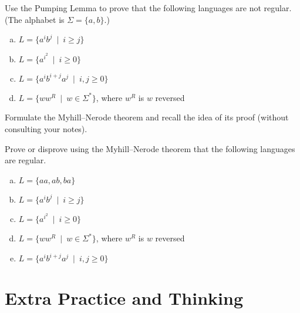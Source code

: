 \documentclass[a4paper,12pt]{amsart}
\begin{document}
    
\medskip\begin{problem}
    
    Use the Pumping Lemma to prove that the following languages are not regular. (The alphabet is $\Sigma=\{a,b\}$.)
    
    \medskip
      
    \begin{enumerate}[(a)]\setlength\itemsep{6pt}        
        \item $L=\{a^ib^j\ \mid\ i\geq j\}$       
        \item $L=\{a^{i^2}\ \mid\ i\geq 0\}$        
        \item $L=\{a^ib^{i+j}a^j\ \mid\ i,j\geq 0\}$
        \item $L=\{ww^R\ \mid \ w\in\Sigma^*\}$, where $w^R$ is $w$ reversed
    \end{enumerate}
      
\end{problem}


\medskip\begin{problem}
    
    Formulate the Myhill--Nerode theorem and recall the idea of its proof (without consulting your notes).

\end{problem}


\medskip\begin{problem}

    Prove or disprove using the Myhill--Nerode theorem that the following languages are regular.
    \begin{enumerate}[(a)]\setlength\itemsep{6pt}
        \item $L=\{aa, ab, ba\}$        
        \item $L=\{a^ib^j\ \mid\ i\geq j\}$        
        \item $L=\{a^{i^2}\ \mid\ i\geq 0\}$ 
        \item $L=\{ww^R\ \mid \ w\in\Sigma^*\}$, where $w^R$ is $w$ reversed
        \item $L=\{a^ib^{i+j}a^j\ \mid\ i,j\geq 0\}$        
    \end{enumerate}

\end{problem}


\section*{Extra Practice and Thinking}
\end{document}

